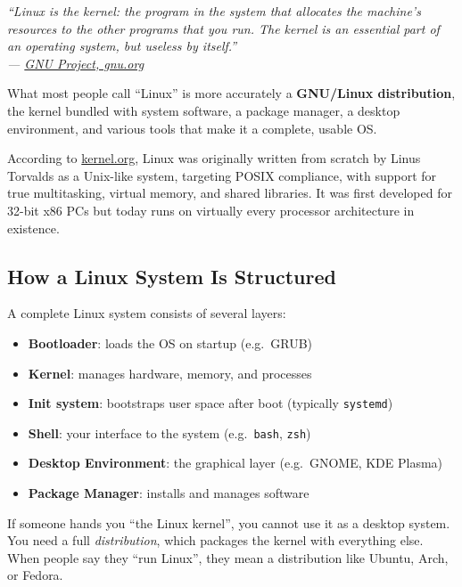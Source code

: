 \documentclass{article}
\newcommand{\code}[1]{\colorbox{codebg}{\texttt{#1}}}
\begin{document}
\begin{mdframed}[linewidth=1.5pt, linecolor=black!50, topline=true, bottomline=true,
  leftline=false, rightline=false, backgroundcolor=black!3]
  \small\itshape
  ``Linux is the kernel: the program in the system that allocates the machine's resources to the other programs that you run. The kernel is an essential part of an operating system, but useless by itself.''\\[4pt]
  \normalfont\small --- \href{https://www.gnu.org/gnu/linux-and-gnu.en.html}{GNU Project, gnu.org}
\end{mdframed}

\noindent What most people call ``Linux'' is more accurately a \textbf{GNU/Linux distribution}, the kernel bundled with system software, a package manager, a desktop environment,
and various tools that make it a complete, usable OS.

According to \href{https://www.kernel.org/linux.html}{kernel.org}, Linux was originally written from scratch by Linus Torvalds as a Unix-like system, targeting POSIX compliance, with support for true multitasking, virtual memory, and shared libraries. It was first developed for 32-bit x86 PCs but today runs on virtually every processor architecture in existence.

\subsection{How a Linux System Is Structured}

A complete Linux system consists of several layers:

\begin{itemize}[leftmargin=1.5em, nosep, label={\tiny\textbullet}]
  \item \textbf{Bootloader}: loads the OS on startup (e.g.\ GRUB)
  \item \textbf{Kernel}: manages hardware, memory, and processes
  \item \textbf{Init system}: bootstraps user space after boot (typically \code{systemd})
  \item \textbf{Shell}: your interface to the system (e.g.\ \code{bash}, \code{zsh})
  \item \textbf{Desktop Environment}: the graphical layer (e.g.\ GNOME, KDE Plasma)
  \item \textbf{Package Manager}: installs and manages software
\end{itemize}

\begin{tcolorbox}[arc=12pt, outer arc=10pt, 
colback=blue!4!white, colframe=blue!40!black, title=\textbf{Kernel $\neq$ OS}]
 If someone hands you ``the Linux kernel'', you cannot use it as a desktop system. You need a full \textit{distribution}, which packages the kernel with everything else. When people say they ``run Linux'', they mean a distribution like Ubuntu, Arch, or Fedora.
\end{tcolorbox}
\end{document}
